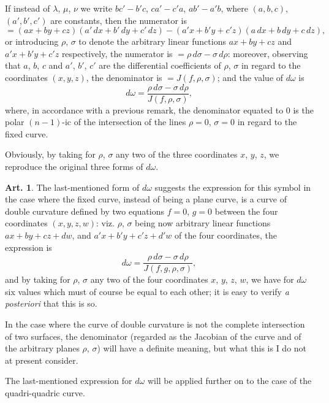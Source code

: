 \documentclass[12pt,a4paper]{article}
\theoremstyle{definition}
\newtheorem{art}{Art.}[section]
\begin{document}
If instead of $\lambda$, $\mu$, $\nu$ we write $bc' - b'c$, $ca' - c'a$, $ab' - a'b$, where $(a, b, c)$, $(a', b', c')$ are constants, then the numerator is
\[
= (ax + by + cz)(a'\,dx + b'\,dy + c'\,dz) - (a'x + b'y + c'z)(a\,dx + b\,dy + c\,dz),
\]
or introducing $\rho$, $\sigma$ to denote the arbitrary linear functions $ax + by + cz$ and $a'x + b'y + c'z$ respectively, the numerator is $= \rho\,d\sigma - \sigma\,d\rho$: moreover, observing that $a$, $b$, $c$ and $a'$, $b'$, $c'$ are the differential coefficients of $\rho$, $\sigma$ in regard to the coordinates $(x, y, z)$, the denominator is $= J(f, \rho, \sigma)$; and the value of $d\omega$ is
\[
d\omega = \frac{\rho\,d\sigma - \sigma\,d\rho}{J(f, \rho, \sigma)},
\]
where, in accordance with a previous remark, the denominator equated to $0$ is the polar $(n - 1)$-ic of the intersection of the lines $\rho = 0$, $\sigma = 0$ in regard to the fixed curve.

Obviously, by taking for $\rho$, $\sigma$ any two of the three coordinates $x$, $y$, $z$, we reproduce the original three forms of $d\omega$.

\begin{art}\label{art:87}
The last-mentioned form of $d\omega$ suggests the expression for this symbol in the case where the fixed curve, instead of being a plane curve, is a curve of double curvature defined by two equations $f = 0$, $g = 0$ between the four coordinates $(x, y, z, w)$: viz. $\rho$, $\sigma$ being now arbitrary linear functions $ax + by + cz + dw$, and $a'x + b'y + c'z + d'w$ of the four coordinates, the expression is
\[
d\omega = \frac{\rho\,d\sigma - \sigma\,d\rho}{J(f, g, \rho, \sigma)},
\]
and by taking for $\rho$, $\sigma$ any two of the four coordinates $x$, $y$, $z$, $w$, we have for $d\omega$ six values which must of course be equal to each other; it is easy to verify \textit{a posteriori} that this is so.

In the case where the curve of double curvature is not the complete intersection of two surfaces, the denominator (regarded as the Jacobian of the curve and of the arbitrary planes $\rho$, $\sigma$) will have a definite meaning, but what this is I do not at present consider.

The last-mentioned expression for $d\omega$ will be applied further on to the case of the quadri-quadric curve.
\end{art}

\newpage
\end{document}

